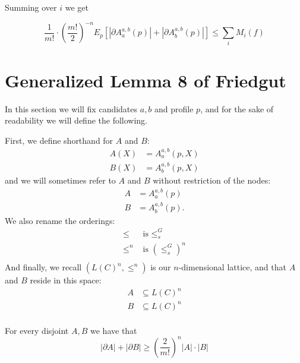 	Summing over $i$ we get

	\begin{corollary}
		\[
			\frac{1}{m!} \cdot \left(\frac{m!}{2}\right)^{-n} E_p[|\partial A^{a,b}_a(p)| + |\partial A^{a,b}_b(p)|] \le \sum_i M_i(f)
		\]
	\end{corollary}


\section{Generalized Lemma 8 of Friedgut}

	In this section we will fix candidates $a, b$ and profile $p$, and for the sake of readability we will define the following.

	First, we define shorthand for $A$ and $B$:
	\begin{align*}
		A(X) &= A^{a,b}_a(p, X) \\
		B(X) &= A^{a,b}_b(p, X)
	\end{align*}
	and we will sometimes refer to $A$ and $B$ without restriction of the nodes:
	\begin{align*}
		A &= A^{a,b}_a(p) \\
		B &= A^{a,b}_b(p).
	\end{align*}
	We also rename the orderings:
	\begin{align*}
		\le &\textrm{ is } \le_s^G \\
		\le^n &\textrm{ is } (\le_s^G)^n \\
	\end{align*}
	And finally, we recall $(L(C)^n, \le^n)$ is our $n$-dimensional lattice, and that $A$ and $B$ reside in this space:
	\begin{align*}
		A &\subseteq L(C)^n \\
		B &\subseteq L(C)^n \\
	\end{align*}

	\begin{lemma}
		\label{friedgut-lemma-8}
		For every disjoint $A, B$ we have that
		\[
			|\partial A| + |\partial B| \ge \left( \frac{2}{m!} \right)^n |A| \cdot |B|
		\]
	\end{lemma}


